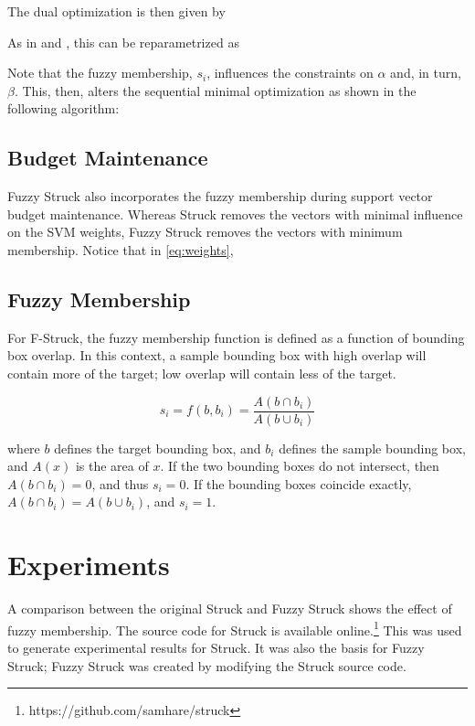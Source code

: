 \documentclass{IEEEtran}
\begin{document}
The dual optimization is then given by
\fuzzyStruckDualAlpha

As in \cite{sequential-minimal-optimization-a-fast-algorithm-for-training-support-vector-machines}
and \cite{6126251}, this can be reparametrized as
\fuzzyStruckDualBeta

Note that the fuzzy membership, \(s_i\), influences the constraints on \(\alpha\) and, in turn,
\(\beta\). This, then, alters the sequential minimal optimization as shown in the following
algorithm:

\fuzzyStruckSmo

\subsection{Budget Maintenance} %
Fuzzy Struck also incorporates the fuzzy membership during support vector budget maintenance.
Whereas Struck removes the vectors with minimal influence on the SVM weights, Fuzzy Struck removes
the vectors with minimum membership. Notice that in \ref{eq:weights}, 


\subsection{Fuzzy Membership} %
For F-Struck, the fuzzy membership function is defined as a function of bounding box overlap. In
this context, a sample bounding box with high overlap will contain more of the target; low overlap
will contain less of the target.

\begin{displaymath}
    s_i = f\left(b, b_i\right) = \frac{A(b \cap b_i)}{A(b \cup b_i)}
\end{displaymath}

where \(b\) defines the target bounding box, and \(b_i\) defines the sample bounding box, and
\(A(x)\) is the area of \(x\). If the two bounding boxes do not intersect, then \(A\left(b \cap
b_i\right) = 0\), and thus \(s_i = 0\). If the bounding boxes coincide exactly,
\(A\left(b \cap b_i\right) = A\left(b \cup b_i\right)\), and \(s_i = 1\).

\section{Experiments} %
A comparison between the original Struck and Fuzzy Struck shows the effect of fuzzy
membership. The source code for Struck is available online.\footnote{https://github.com/samhare/struck}
This was used to generate experimental results for Struck. It was also the basis for Fuzzy Struck;
Fuzzy Struck was created by modifying the Struck source code.
\end{document}
